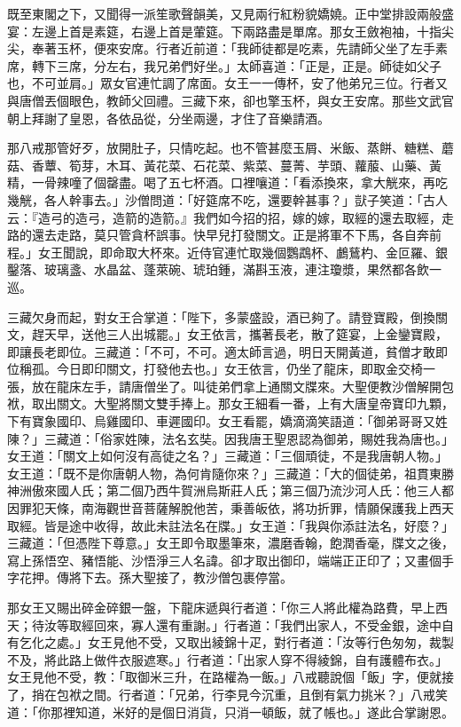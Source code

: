 既至東閣之下，又聞得一派笙歌聲韻美，又見兩行紅粉貌嬌嬈。正中堂排設兩般盛宴：左邊上首是素筵，右邊上首是葷筵。下兩路盡是單席。那女王斂袍袖，十指尖尖，奉著玉杯，便來安席。行者近前道：「我師徒都是吃素，先請師父坐了左手素席，轉下三席，分左右，我兄弟們好坐。」太師喜道：「正是，正是。師徒如父子也，不可並肩。」眾女官連忙調了席面。女王一一傳杯，安了他弟兄三位。行者又與唐僧丟個眼色，教師父回禮。三藏下來，卻也擎玉杯，與女王安席。那些文武官朝上拜謝了皇恩，各依品從，分坐兩邊，才住了音樂請酒。

那八戒那管好歹，放開肚子，只情吃起。也不管甚麼玉屑、米飯、蒸餅、糖糕、蘑菇、香蕈、筍芽，木耳、黃花菜、石花菜、紫菜、蔓菁、芋頭、蘿菔、山藥、黃精，一骨辣噇了個罄盡。喝了五七杯酒。口裡嚷道：「看添換來，拿大觥來，再吃幾觥，各人幹事去。」沙僧問道：「好筵席不吃，還要幹甚事？」獃子笑道：「古人云：『造弓的造弓，造箭的造箭。』我們如今招的招，嫁的嫁，取經的還去取經，走路的還去走路，莫只管貪杯誤事。快早兒打發關文。正是將軍不下馬，各自奔前程。」女王聞說，即命取大杯來。近侍官連忙取幾個鸚鵡杯、鸕鶿杓、金叵羅、銀鑿落、玻璃盞、水晶盆、蓬萊碗、琥珀鍾，滿斟玉液，連注瓊漿，果然都各飲一巡。

三藏欠身而起，對女王合掌道：「陛下，多蒙盛設，酒已夠了。請登寶殿，倒換關文，趕天早，送他三人出城罷。」女王依言，攜著長老，散了筵宴，上金鑾寶殿，即讓長老即位。三藏道：「不可，不可。適太師言過，明日天開黃道，貧僧才敢即位稱孤。今日即印關文，打發他去也。」女王依言，仍坐了龍床，即取金交椅一張，放在龍床左手，請唐僧坐了。叫徒弟們拿上通關文牒來。大聖便教沙僧解開包袱，取出關文。大聖將關文雙手捧上。那女王細看一番，上有大唐皇帝寶印九顆，下有寶象國印、烏雞國印、車遲國印。女王看罷，嬌滴滴笑語道：「御弟哥哥又姓陳？」三藏道：「俗家姓陳，法名玄奘。因我唐王聖恩認為御弟，賜姓我為唐也。」女王道：「關文上如何沒有高徒之名？」三藏道：「三個頑徒，不是我唐朝人物。」女王道：「既不是你唐朝人物，為何肯隨你來？」三藏道：「大的個徒弟，祖貫東勝神洲傲來國人氏；第二個乃西牛賀洲烏斯莊人氏；第三個乃流沙河人氏：他三人都因罪犯天條，南海觀世音菩薩解脫他苦，秉善皈依，將功折罪，情願保護我上西天取經。皆是途中收得，故此未註法名在牒。」女王道：「我與你添註法名，好麼？」三藏道：「但憑陛下尊意。」女王即令取墨筆來，濃磨香翰，飽潤香毫，牒文之後，寫上孫悟空、豬悟能、沙悟淨三人名諱。卻才取出御印，端端正正印了；又畫個手字花押。傳將下去。孫大聖接了，教沙僧包裹停當。

那女王又賜出碎金碎銀一盤，下龍床遞與行者道：「你三人將此權為路費，早上西天；待汝等取經回來，寡人還有重謝。」行者道：「我們出家人，不受金銀，途中自有乞化之處。」女王見他不受，又取出綾錦十疋，對行者道：「汝等行色匆匆，裁製不及，將此路上做件衣服遮寒。」行者道：「出家人穿不得綾錦，自有護體布衣。」女王見他不受，教：「取御米三升，在路權為一飯。」八戒聽說個「飯」字，便就接了，捎在包袱之間。行者道：「兄弟，行李見今沉重，且倒有氣力挑米？」八戒笑道：「你那裡知道，米好的是個日消貨，只消一頓飯，就了帳也。」遂此合掌謝恩。

